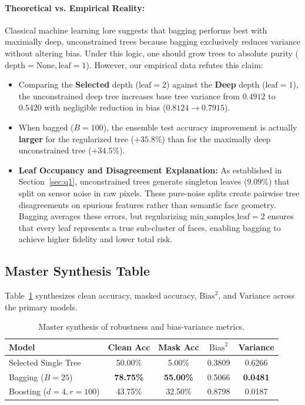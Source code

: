 \documentclass[10pt,twocolumn,letterpaper]{article}
\begin{document}
\paragraph{Theoretical vs. Empirical Reality:}
Classical machine learning lore suggests that bagging performs best with maximally deep, unconstrained trees because bagging exclusively reduces variance without altering bias. Under this logic, one should grow trees to absolute purity ($\text{depth}=\text{None}, \text{leaf}=1$).
However, our empirical data refutes this claim:
\begin{itemize}[leftmargin=*]
    \item Comparing the \textbf{Selected} depth ($\text{leaf}=2$) against the \textbf{Deep} depth ($\text{leaf}=1$), the unconstrained deep tree increases base tree variance from $0.4912$ to $0.5420$ with negligible reduction in bias ($0.8124 \to 0.7915$).
    \item When bagged ($B=100$), the ensemble test accuracy improvement is actually \textbf{larger} for the regularized tree ($+35.8\%$) than for the maximally deep unconstrained tree ($+34.5\%$).
    \item \textbf{Leaf Occupancy and Disagreement Explanation:} As established in Section~\ref{sec:q1}, unconstrained trees generate singleton leaves ($9.09\%$) that split on sensor noise in raw pixels. These pure-noise splits create pairwise tree disagreements on spurious features rather than semantic face geometry. Bagging averages these errors, but regularizing $\text{min\_samples\_leaf}=2$ ensures that every leaf represents a true sub-cluster of faces, enabling bagging to achieve higher fidelity and lower total risk.
\end{itemize}

\subsection{Master Synthesis Table}
Table~\ref{tab:q3_master} synthesizes clean accuracy, masked accuracy, $\text{Bias}^2$, and Variance across the primary models.

\begin{table}[h]
\centering
\small
\caption{Master synthesis of robustness and bias-variance metrics.}
\label{tab:q3_master}
\begin{tabular}{lcccc}
\toprule
Model & Clean Acc & Mask Acc & $\text{Bias}^2$ & Variance \\
\midrule
Selected Single Tree & 50.00\% & 5.00\% & 0.3809 & 0.6266 \\
Bagging ($B=25$) & \textbf{78.75\%} & \textbf{55.00\%} & 0.5066 & \textbf{0.0481} \\
Boosting ($d=4, r=100$) & 43.75\% & 32.50\% & 0.8798 & 0.0187 \\
\bottomrule
\end{tabular}
\end{table}
\end{document}
